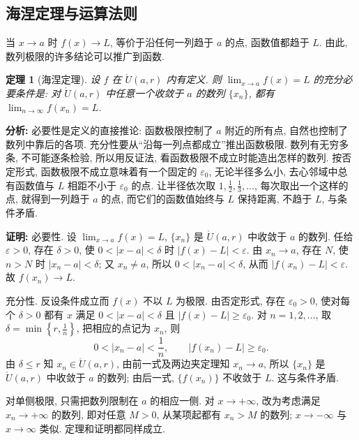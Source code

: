 \documentclass[UTF8,openany]{ctexbook}
\theoremstyle{chinesetextbook}
\newtheorem{theorem}{定理}[section]
\newenvironment{cnproof}{\par\indent\textbf{证明:} \ignorespaces}{\par}
\begin{document}
\subsection{海涅定理与运算法则}
当 $x\to a$ 时 $f(x)\to L$, 等价于沿任何一列趋于 $a$ 的点, 函数值都趋于 $L$. 由此, 数列极限的许多结论可以推广到函数.
\begin{theorem}[海涅定理]
设 $f$ 在 $\mathring U(a,r)$ 内有定义. 则 $\displaystyle\lim_{x\to a}f(x)=L$ 的充分必要条件是: 对 $\mathring U(a,r)$ 中任意一个收敛于 $a$ 的数列 $\{x_n\}$, 都有 $\displaystyle\lim_{n\to\infty}f(x_n)=L$.
\end{theorem}
\par\indent\textbf{分析:} 必要性是定义的直接推论: 函数极限控制了 $a$ 附近的所有点, 自然也控制了数列中靠后的各项. 充分性要从“沿每一列点都成立”推出函数极限. 数列有无穷多条, 不可能逐条检验, 所以用反证法, 看函数极限不成立时能造出怎样的数列. 按否定形式, 函数极限不成立意味着有一个固定的 $\varepsilon_0$, 无论半径多么小, 去心邻域中总有函数值与 $L$ 相距不小于 $\varepsilon_0$ 的点. 让半径依次取 $\displaystyle1,\frac12,\frac13,\ldots$, 每次取出一个这样的点, 就得到一列趋于 $a$ 的点, 而它们的函数值始终与 $L$ 保持距离, 不趋于 $L$, 与条件矛盾.
\begin{cnproof}
必要性. 设 $\displaystyle\lim_{x\to a}f(x)=L$, $\{x_n\}$ 是 $\mathring U(a,r)$ 中收敛于 $a$ 的数列. 任给 $\varepsilon>0$, 存在 $\delta>0$, 使 $0<|x-a|<\delta$ 时 $|f(x)-L|<\varepsilon$. 由 $x_n\to a$, 存在 $N$, 使 $n>N$ 时 $|x_n-a|<\delta$; 又 $x_n\ne a$, 所以 $0<|x_n-a|<\delta$, 从而 $|f(x_n)-L|<\varepsilon$. 故 $f(x_n)\to L$.

充分性. 反设条件成立而 $f(x)$ 不以 $L$ 为极限. 由否定形式, 存在 $\varepsilon_0>0$, 使对每个 $\delta>0$ 都有 $x$ 满足 $0<|x-a|<\delta$ 且 $|f(x)-L|\ge\varepsilon_0$. 对 $n=1,2,\ldots$, 取 $\displaystyle\delta=\min\left\{r,\frac1n\right\}$, 把相应的点记为 $x_n$, 则
\[
0<|x_n-a|<\frac1n,\qquad|f(x_n)-L|\ge\varepsilon_0.
\]
由 $\delta\le r$ 知 $x_n\in\mathring U(a,r)$, 由前一式及两边夹定理知 $x_n\to a$, 所以 $\{x_n\}$ 是 $\mathring U(a,r)$ 中收敛于 $a$ 的数列; 由后一式, $\{f(x_n)\}$ 不收敛于 $L$. 这与条件矛盾.
\end{cnproof}
对单侧极限, 只需把数列限制在 $a$ 的相应一侧. 对 $x\to+\infty$, 改为考虑满足 $x_n\to+\infty$ 的数列, 即对任意 $M>0$, 从某项起都有 $x_n>M$ 的数列; $x\to-\infty$ 与 $x\to\infty$ 类似. 定理和证明都同样成立.
\end{document}
